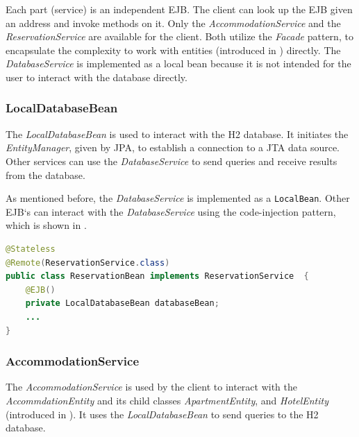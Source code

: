 Each part (service) is an independent EJB. The client can look up the EJB given an address and invoke methods on it. Only the \textit{AccommodationService} and the \textit{ReservationService} are available for the client. Both utilize the \textit{Facade} pattern, to encapsulate the complexity to work with entities (introduced in ) directly. The \textit{DatabaseService} is implemented as a local bean because it is not intended for the user to interact with the database directly.


\subsubsection{LocalDatabaseBean}\label{sec:02_design_beans_local}
The \textit{LocalDatabaseBean} is used to interact with the H2 database. It initiates the \textit{EntityManager}, given by JPA, to establish a connection to a JTA data source. Other services can use the \textit{DatabaseService} to send queries and receive results from the database.

As mentioned before, the \textit{DatabaseService} is implemented as a \texttt{LocalBean}. Other EJB`s can interact with the \textit{DatabaseService} using the code-injection pattern, which is shown in .
\begin{lstlisting}[label=lst:02_design_ejb_db_cinjection, caption=Usage of the \textit{LocalDatabaseBean} using code-injection, language=java]
@Stateless
@Remote(ReservationService.class)
public class ReservationBean implements ReservationService  {
    @EJB()
    private LocalDatabaseBean databaseBean;
    ...
}
\end{lstlisting}


\subsubsection{AccommodationService}\label{sec:02_design_beans_acc}
The \textit{AccommodationService} is used by the client to interact with the \textit{AccommdationEntity} and its child classes \textit{ApartmentEntity}, and \textit{HotelEntity} (introduced in ). It uses the \textit{LocalDatabaseBean} to send queries to the H2 database.

